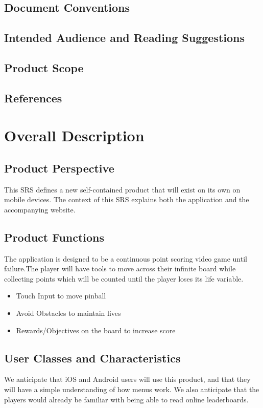 \documentclass[11pt]{article}
\begin{document}
\subsection{Document Conventions}
\label{sec:org4116edd}
\subsection{Intended Audience and Reading Suggestions}
\label{sec:orgd80f1fe}
\subsection{Product Scope}
\label{sec:org5ce12bf}
\subsection{References}
\label{sec:org75faee9}
\section{Overall Description}
\label{sec:orga5f9dc7}
\subsection{Product Perspective}
\label{sec:org2898fa9}
This SRS defines a new self-contained product that will exist on its own on mobile devices. The context of this SRS explains both the application and the accompanying website. 
\subsection{Product Functions}
\label{sec:org69bfba2}
The application is designed to be a continuous point scoring video game until failure.The player will have tools to move across their infinite board while collecting points which will be counted until the player loses its life variable.
\begin{itemize}
\item Touch Input to move pinball
\item Avoid Obstacles to maintain lives
\item Rewards/Objectives on the board to increase score
\end{itemize}
\subsection{User Classes and Characteristics}
\label{sec:org4c2e530}
We anticipate that iOS and Android users will use this product, and that they will have a simple understanding of how menus work. We also anticipate that the players would already be familiar with being able to read online leaderboards. 
\end{document}
